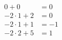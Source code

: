 \documentclass[preview]{standalone}
\begin{document}
\begin{align*}
0 + 0 & = 0\\- 2\cdot1 + 2 & = 0 \\ - 2\cdot1 + 1 & = -1 \\ - 2\cdot2 + 5 & = 1
\end{align*}
\end{document}
